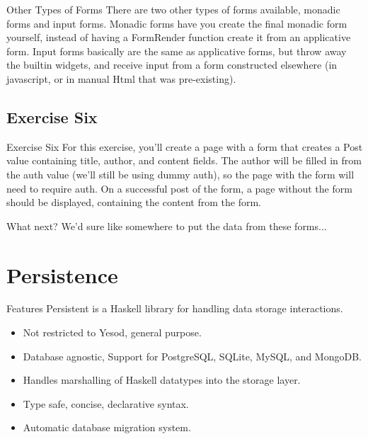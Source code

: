 \documentclass[pdf]{beamer}
\begin{document}
\begin{frame}{Other Types of Forms}
  There are two other types of forms available, monadic forms and
  input forms. Monadic forms have you create the final monadic form
  yourself, instead of having a FormRender function create it from an
  applicative form. Input forms basically are the same as applicative
  forms, but throw away the builtin widgets, and receive input from a
  form constructed elsewhere (in javascript, or in manual Html that
  was pre-existing).
\end{frame}

\subsection{Exercise Six}
\begin{frame}{Exercise Six}
  For this exercise, you'll create a page with a form that creates a
  Post value containing title, author, and content fields. The author
  will be filled in from the auth value (we'll still be using dummy
  auth), so the page with the form will need to require auth. On a
  successful post of the form, a page without the form should be
  displayed, containing the content from the form.
\end{frame}

\begin{frame}{What next?}
  We'd sure like somewhere to put the data from these forms...
\end{frame}

\section{Persistence}
\begin{frame}{Features}
  Persistent is a Haskell library for handling data storage interactions.
  \begin{itemize}
  \item<1-> Not restricted to Yesod, general purpose.
  \item<2-> Database agnostic, Support for PostgreSQL, SQLite, MySQL, and MongoDB.
  \item<3-> Handles marshalling of Haskell datatypes into the storage layer.
  \item<4-> Type safe, concise, declarative syntax.
  \item<5-> Automatic database migration system.
  \end{itemize}
\end{frame}
\end{document}
